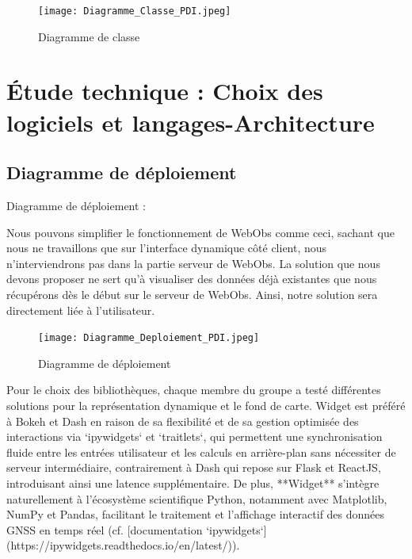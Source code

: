\documentclass[11pt]{article}
\begin{document}
\begin{figure}[h!]
    \centering 
    \texttt{[image: Diagramme\_Classe\_PDI.jpeg]} 
    \caption{Diagramme de classe} 
\end{figure}


\section{Étude technique : Choix des logiciels et langages-Architecture}

 \subsection{Diagramme de déploiement}
\vspace{0,1cm}
Diagramme de déploiement :

Nous pouvons simplifier le fonctionnement de WebObs comme ceci, sachant que nous ne travaillons que sur l’interface dynamique côté client, nous n’interviendrons pas dans la partie serveur de WebObs. La solution que nous devons proposer ne sert qu’à visualiser des données déjà existantes que nous récupérons dès le début sur le serveur de WebObs. Ainsi, notre solution sera directement liée à l’utilisateur.

\begin{figure}[h!]
    \centering 
    \texttt{[image: Diagramme\_Deploiement\_PDI.jpeg]} 
    \caption{Diagramme de déploiement} 
\end{figure}

\newpage 
Pour le choix des bibliothèques, chaque membre du groupe a testé différentes solutions pour la représentation dynamique et le fond de carte. Widget est préféré à Bokeh et Dash en raison de sa flexibilité et de sa gestion optimisée des interactions via `ipywidgets` et `traitlets`, qui permettent une synchronisation fluide entre les entrées utilisateur et les calculs en arrière-plan sans nécessiter de serveur intermédiaire, contrairement à Dash qui repose sur Flask et ReactJS, introduisant ainsi une latence supplémentaire. De plus, **Widget** s’intègre naturellement à l'écosystème scientifique Python, notamment avec Matplotlib, NumPy et Pandas, facilitant le traitement et l'affichage interactif des données GNSS en temps réel (cf. [documentation `ipywidgets`](https://ipywidgets.readthedocs.io/en/latest/)).
\end{document}
